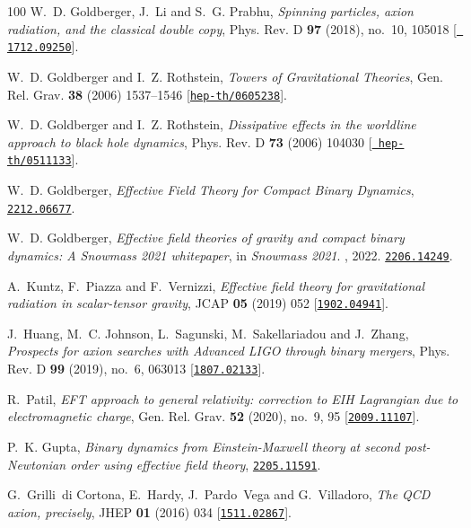 \begin{thebibliography}{100}
W.~D. Goldberger, J.~Li and S.~G. Prabhu,  {\em {Spinning particles, axion
  radiation, and the classical double copy}}, Phys. Rev. D {\bf 97} (2018),
  no.~10, 105018 [\href{http://www.arXiv.org/abs/1712.09250}{{\tt
  1712.09250}}].

W.~D. Goldberger and I.~Z. Rothstein,  {\em {Towers of Gravitational
  Theories}}, Gen. Rel. Grav. {\bf 38} (2006) 1537--1546
  [\href{http://www.arXiv.org/abs/hep-th/0605238}{{\tt hep-th/0605238}}].

W.~D. Goldberger and I.~Z. Rothstein,  {\em {Dissipative effects in the
  worldline approach to black hole dynamics}}, Phys. Rev. D {\bf 73} (2006)
  104030 [\href{http://www.arXiv.org/abs/hep-th/0511133}{{\tt
  hep-th/0511133}}].

W.~D. Goldberger,  {\em {Effective Field Theory for Compact Binary Dynamics}},
  \href{http://www.arXiv.org/abs/2212.06677}{{\tt 2212.06677}}.

W.~D. Goldberger,  {\em {Effective field theories of gravity and compact binary
  dynamics: A Snowmass 2021 whitepaper}}, in {\em {Snowmass 2021}}.
, 2022.
\newblock \href{http://www.arXiv.org/abs/2206.14249}{{\tt 2206.14249}}.

A.~Kuntz, F.~Piazza and F.~Vernizzi,  {\em {Effective field theory for
  gravitational radiation in scalar-tensor gravity}}, JCAP {\bf 05} (2019) 052
  [\href{http://www.arXiv.org/abs/1902.04941}{{\tt 1902.04941}}].

J.~Huang, M.~C. Johnson, L.~Sagunski, M.~Sakellariadou and J.~Zhang,  {\em
  {Prospects for axion searches with Advanced LIGO through binary mergers}},
  Phys. Rev. D {\bf 99} (2019), no.~6, 063013
  [\href{http://www.arXiv.org/abs/1807.02133}{{\tt 1807.02133}}].

R.~Patil,  {\em {EFT approach to general relativity: correction to EIH
  Lagrangian due to electromagnetic charge}}, Gen. Rel. Grav. {\bf 52} (2020),
  no.~9, 95 [\href{http://www.arXiv.org/abs/2009.11107}{{\tt 2009.11107}}].

P.~K. Gupta,  {\em {Binary dynamics from Einstein-Maxwell theory at second
  post-Newtonian order using effective field theory}},
  \href{http://www.arXiv.org/abs/2205.11591}{{\tt 2205.11591}}.

G.~Grilli~di Cortona, E.~Hardy, J.~Pardo~Vega and G.~Villadoro,  {\em {The QCD
  axion, precisely}}, JHEP {\bf 01} (2016) 034
  [\href{http://www.arXiv.org/abs/1511.02867}{{\tt 1511.02867}}].


\end{thebibliography}
